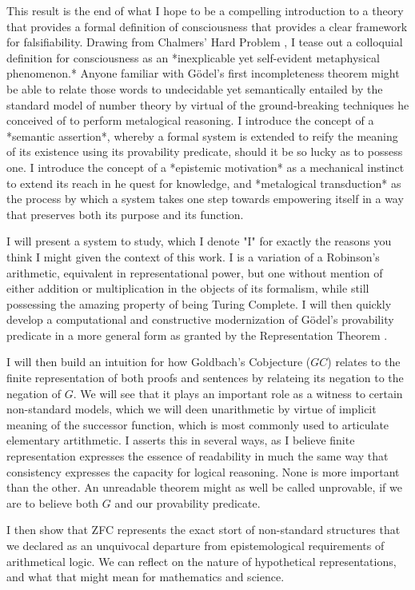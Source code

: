 \documentclass[runningheads]{llncs}
\begin{document}
This result is the end of what I hope to be a compelling introduction to a theory that provides a formal definition of consciousness that provides a clear framework for falsifiability. Drawing from Chalmers' Hard Problem \cite{Chalmers1995}, I tease out a colloquial definition for consciousness as an *inexplicable yet self-evident metaphysical phenomenon.* Anyone familiar with Gödel's first incompleteness theorem might be able to relate those words to undecidable yet semantically entailed by the standard model of number theory by virtual of the ground-breaking techniques he conceived of to perform metalogical reasoning. I introduce the concept of a *semantic assertion*, whereby a formal system is extended to reify the meaning of its existence using its provability predicate, should it be so lucky as to possess one. I introduce the concept of a *epistemic motivation* as a mechanical instinct to extend its reach in he quest for knowledge, and *metalogical transduction* as the process by which a system takes one step towards empowering itself in a way that preserves both its purpose and its function.

I will present a system to study, which I denote "I" for exactly the reasons you think I might given the context of this work. I is a variation of a Robinson's arithmetic, equivalent in representational power, but one without mention of either addition or multiplication in the objects of its formalism, while still possessing the amazing property of being Turing Complete. I will then quickly develop a computational and constructive modernization of Gödel's provability predicate in a more general form as granted by the Representation Theorem \cite{Tarski1933}.

I will then build an intuition for how Goldbach's Cobjecture ($GC$) relates to the finite representation of both proofs and sentences by relateing its negation to the negation of $G$. We will see that it plays an important role as a witness to certain non-standard models, which we will deen unarithmetic by virtue of implicit meaning of the successor function, which is most commonly used to articulate elementary artithmetic. I asserts this in several ways, as I believe finite representation expresses the essence of readability in much the same way that consistency expresses the capacity for logical reasoning. None is more important than the other. An unreadable theorem might as well be called unprovable, if we are to believe both $G$ and our provability predicate.

I then show that ZFC represents the exact stort of non-standard structures that we declared as an unquivocal departure from epistemological requirements of arithmetical logic. We can reflect on the nature of hypothetical representations, and what that might mean for mathematics and science. 
\end{document}
